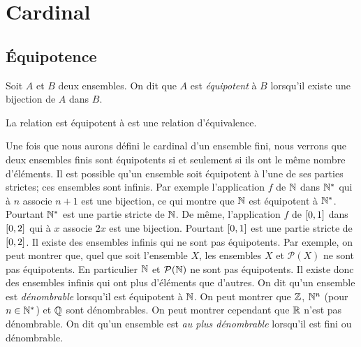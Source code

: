 \documentclass{magnolia}
\begin{document}

\magtoc

\section{Cardinal}

\subsection{Équipotence}

\begin{definition}
Soit $A$ et $B$ deux ensembles. On dit que $A$ est \emph{équipotent} à $B$
lorsqu'il existe une bijection de $A$ dans $B$.
\end{definition}

\begin{proposition}
La relation \og est équipotent à \fg est une relation d'équivalence.
\end{proposition}

\begin{remarques}
\remarque Une fois que nous aurons défini le cardinal d'un ensemble fini, nous verrons que deux ensembles
  finis sont équipotents si et seulement si ils ont le même nombre d'éléments.
\remarque Il est possible qu'un ensemble soit équipotent à l'une de ses parties strictes; ces ensembles sont infinis.
  Par exemple l'application $f$ de $\mathbb{N}$ dans ${\mathbb{N}^*}$ qui à $n$ associe $n+1$ est une bijection, ce qui montre que $\mathbb{N}$
  est équipotent à ${\mathbb{N}^*}$. Pourtant ${\mathbb{N}^*}$ est une partie stricte de $\mathbb{N}$. De même, l'application $f$
  de $\left[0,1\right]$ dans $\left[0,2\right]$ qui à $x$ associe $2x$ est une bijection. Pourtant
  $\left[0,1\right]$ est une partie stricte de $\left[0,2\right]$.
\remarque Il existe des ensembles infinis qui ne sont pas équipotents. Par exemple, on peut montrer que,
  quel que soit l'ensemble $X$, les ensembles $X$ et $\mathcal{P}(X)$ ne sont pas équipotents. En particulier
  $\mathbb{N}$ et $\mathcal{P}(\mathbb{N})$ ne sont pas équipotents. Il existe donc des ensembles infinis qui ont
  \og plus d'éléments \fg que d'autres.
\remarque On dit qu'un ensemble est \emph{dénombrable} lorsqu'il est équipotent à $\mathbb{N}$. On peut montrer
  que $\mathbb{Z}$, $\mathbb{N}^n$ (pour $n\in{\mathbb{N}^*}$) et $\mathbb{Q}$ sont dénombrables. On peut montrer cependant que $\mathbb{R}$ n'est
  pas dénombrable.  On dit qu'un ensemble est \emph{au plus dénombrable} lorsqu'il est fini ou dénombrable. 
\end{remarques}
\end{document}
